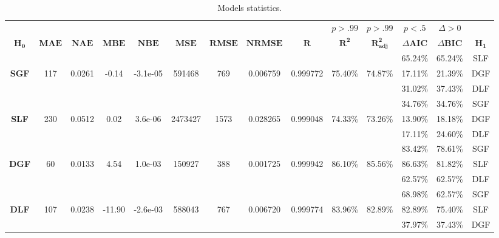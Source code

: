 
\begin{table}
  \begin{center}
    \caption{Models statistics.}
    \label{tab:table1}
    \resizebox{\textwidth}{!} {
    \begin{tabular}{c|c|c|c|c|c|c|c|c|c|c|c|c|c}
        \toprule
        & & & & & & & & & $p>.99$ & $p>.99$ & $p<.5$ & $\Delta > 0$ & \\
        $\mathbf{H_0}$ &
        $\mathbf{MAE}$ & $\mathbf{NAE}$ & 
        $\mathbf{MBE}$ & $\mathbf{NBE}$ & 
        $\mathbf{MSE}$ & $\mathbf{RMSE}$ &
        $\mathbf{NRMSE}$ & $\mathbf{R}$ &
        $\mathbf{R^2}$ & $\mathbf{R^2_{adj}}$ &
        $\Delta \mathbf{AIC}$ & $\Delta \mathbf{BIC}$ &
        $\mathbf{H_1}$ \\

        \midrule
         & & & & & & & & & & & 65.24\% & 65.24\% & SLF \\
         \textbf{SGF} & 
             117 & 0.0261 & 
             -0.14 & -3.1e-05 & 
             591468 & 769 & 
             0.006759 & 0.999772 & 
             75.40\% & 
             74.87\% & 
             17.11\% & 21.39\% & DGF \\
         & & & & & & & & & & & 31.02\% & 37.43\% & DLF \\

        \midrule
         & & & & & & & & & & & 34.76\% & 34.76\% & SGF \\
         \textbf{SLF} & 
             230 & 0.0512 & 
             0.02 & 3.6e-06 & 
             2473427 & 1573 & 
             0.028265 & 0.999048 & 
             74.33\% & 
             73.26\% & 
             13.90\% & 18.18\% & DGF \\
         & & & & & & & & & & & 17.11\% & 24.60\% & DLF \\

        \midrule
         & & & & & & & & & & & 83.42\% & 78.61\% & SGF \\
         \textbf{DGF} & 
             60 & 0.0133 & 
             4.54 & 1.0e-03 & 
             150927 & 388 & 
             0.001725 & 0.999942 & 
             86.10\% & 
             85.56\% & 
             86.63\% & 81.82\% & SLF \\
         & & & & & & & & & & & 62.57\% & 62.57\% & DLF \\

        \midrule
         & & & & & & & & & & & 68.98\% & 62.57\% & SGF \\
         \textbf{DLF} & 
             107 & 0.0238 & 
             -11.90 & -2.6e-03 & 
             588043 & 767 & 
             0.006720 & 0.999774 & 
             83.96\% & 
             82.89\% & 
             82.89\% & 75.40\% & SLF \\
         & & & & & & & & & & & 37.97\% & 37.43\% & DGF \\

        \bottomrule
    \end{tabular} }
  \end{center}
\end{table}
